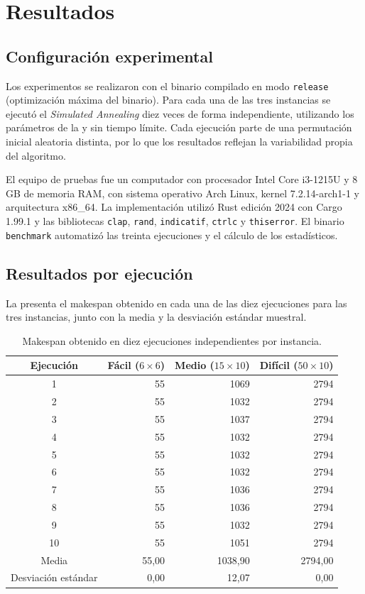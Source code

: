 \chapter{Resultados}
\label{ch:resultados}

\section{Configuración experimental}

Los experimentos se realizaron con el binario compilado en modo \texttt{release} (optimización máxima del binario).
Para cada una de las tres instancias se ejecutó el \emph{Simulated Annealing} diez veces de forma independiente,
utilizando los parámetros de la  y sin tiempo límite.
Cada ejecución parte de una permutación inicial aleatoria distinta,
por lo que los resultados reflejan la variabilidad propia del algoritmo.

El equipo de pruebas fue un computador con procesador Intel Core i3-1215U y 8 GB de memoria RAM,
con sistema operativo Arch Linux, kernel 7.2.14-arch1-1 y arquitectura x86\_64.
La implementación utilizó Rust edición 2024 con Cargo 1.99.1 y las bibliotecas
\texttt{clap}, \texttt{rand}, \texttt{indicatif}, \texttt{ctrlc} y \texttt{thiserror}.
El binario \texttt{benchmark} automatizó las treinta ejecuciones y el cálculo de los estadísticos.

\section{Resultados por ejecución}

La  presenta el makespan obtenido en cada una de las diez ejecuciones
para las tres instancias, junto con la media y la desviación estándar muestral.

\begin{table}[htbp]
\centering
\begin{tabular}{crrr}
\toprule
Ejecución & Fácil (\(6\times6\)) & Medio (\(15\times10\)) & Difícil (\(50\times10\)) \\
\midrule
1  & 55 & 1069 & 2794 \\
2  & 55 & 1032 & 2794 \\
3  & 55 & 1037 & 2794 \\
4  & 55 & 1032 & 2794 \\
5  & 55 & 1032 & 2794 \\
6  & 55 & 1032 & 2794 \\
7  & 55 & 1036 & 2794 \\
8  & 55 & 1036 & 2794 \\
9  & 55 & 1032 & 2794 \\
10 & 55 & 1051 & 2794 \\
\midrule
Media & 55,00 & 1038,90 & 2794,00 \\
Desviación estándar & 0,00 & 12,07 & 0,00 \\
\bottomrule
\end{tabular}
\caption{Makespan obtenido en diez ejecuciones independientes por instancia.}
\label{tab:ejecuciones}
\end{table}

